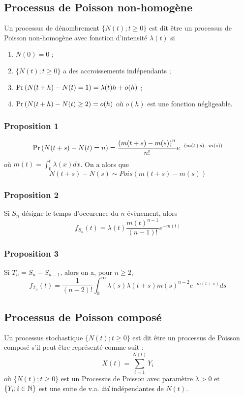\documentclass[10pt, french]{article}
\begin{document}
\begin{multicols*}{2}
\subsection*{Processus de Poisson non-homogène}
\begin{definition}[Définition]
Un processus de dénombrement $\{ N(t) ; t \geq 0 \}$ est dit être un processus de Poisson non-homogène avec fonction d'intensité $\lambda(t)$ si
\begin{enumerate}[label=(\arabic*)]
\item $N(0) = 0$ ;
\item $\{ N(t) ; t \geq 0 \}$ a des accroissements indépendants ;
\item $\Pr \left( N(t+h) - N(t) = 1 \right) = \lambda(t) h + o(h)$ ;
\item $\Pr \left( N(t+h) - N(t) \geq 2 \right) = o(h)$ où $o(h)$ est une fonction négligeable.
\end{enumerate}
\end{definition}

\subsubsection*{Proposition 1}
\[\Pr \left( N(t+s) - N(t) = n \right)  = \frac{\left(m(t+s) - m(s) \right)^n}{n!} e^{-(m(t+s) - m(s))} \]
où $m(t) = \int_{0}^{t} \lambda(x) dx$. On a alors que
\[N(t+s) - N(s) \sim Pois(m(t+s) - m(s))\]


\subsubsection*{Proposition 2}
Si $S_n$ désigne le temps d'occurence du $n$ évènement, alors
\[f_{S_n}(t) = \lambda(t) \frac{m(t)^{n-1}}{(n-1)!} e^{-m(t)} \]

\subsubsection*{Proposition 3}
Si $T_n = S_{n} - S_{n-1}$, alors on a, pour $n \geq 2$,
\[f_{T_n}(t) = \frac{1}{(n-2)!} \int_{0}^{\infty} \lambda(s) \lambda(t+s) m(s)^{n-2} e^{-m(t+s)} ds \]
\subsection*{Processus de Poisson composé}
\begin{definition}[Définition]
Un processus stochastique $\{ N(t) ; t \geq 0  \}$ est dit être un processus de Poisson composé s'il peut être représenté comme suit : 
\[X(t) = \sum_{i=1}^{N(t)} Y_i\]
où $\{ N(t) ; t \geq 0  \}$ est un Processus de Poisson avec paramètre $\lambda > 0$ et $\{ Y_i ; i \in \mathbb{N} \}$ est une suite de v.a. \emph{iid} indépendantes de $N(t)$.
\end{definition}


\end{multicols*}
\end{document}
